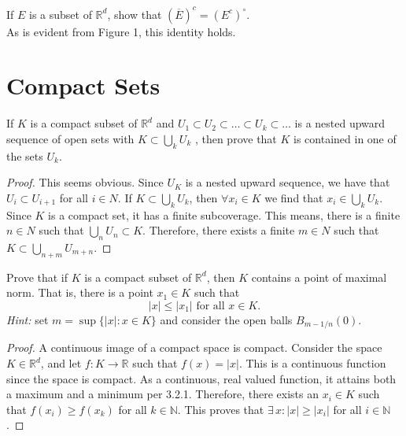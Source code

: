\documentclass[12pt]{book}
\newcommand{\N}{\mathbb{N}}
\newcommand{\R}{\mathbb{R}}
\newenvironment{exercise}[2][Exercise]{\begin{trivlist}
\item[\hskip \labelsep {\bfseries #1}\hskip \labelsep {\bfseries #2.}]}{\end{trivlist}}
\begin{document}
\begin{exercise}{7.3.15}
If $E$ is a subset of $\R^d$, show that $(\overline{E})^c = (E^c)^\circ$. \\

As is evident from Figure 1, this identity holds.
\end{exercise}



\section{Compact Sets}


\begin{exercise}{7.4.1}
If $K$ is a compact subset of $\R^d$ and $U_1 \subset U_2 \subset \hdots \subset U_k \subset \hdots$ is a
nested upward sequence of open sets with $K \subset \bigcup_k U_k$ , then prove that $K$ is contained in one of the sets $U_k$.



\begin{proof}
    This seems obvious. Since $U_K$ is a nested upward sequence, we have that $U_i \subset U_{i+1}$ for all $i\in N$. If $K \subset \bigcup_k U_k$, then $\forall x_i \in K$ we find that $x_i \in \bigcup_k U_k$. Since $K$ is a compact set, it has a finite subcoverage. This means, there is a finite $n \in N$ such that $\bigcup_n U_n \subset K$. Therefore, there exists a finite $m \in N$ such that $K \subset \bigcup_{n+m} U_{m+n}$.  
\end{proof}
\end{exercise}




\begin{exercise}{7.4.4}
Prove that if $K$ is a compact subset of $\R^d$, then $K$ contains a point of maximal norm. That is, there is a point $x_1 \in K$ such that 
    \[ |x| \leq |x_1| \text{ for all } x \in K. \]
\emph{Hint:} set $m =\sup\{ |x| : x \in K \}$  and consider the open balls $B_{m-1/n}(0)$.
    
    \begin{proof}
    A continuous image of a compact space is compact. Consider the space $K \in \R^d$, and let $f:K \to \R$ such that $f(x)=|x|$. This is a continuous function since the space is compact. As a continuous, real valued function, it attains both a maximum and a minimum per 3.2.1. Therefore, there exists an $x_i \in K$ such that $f(x_i) \geq f(x_k)$ for all $k \in \N$. This proves that $\exists \,x : |x| \geq |x_i|$ for all $i \in \N$.
    \end{proof}
\end{exercise}
\end{document}
